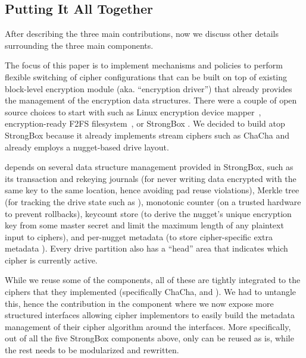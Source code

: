 \subsection{Putting It All Together}\label{subsec:des-summary}

After describing the three main contributions, now we discuss other details
surrounding the three main components.


 The focus of this paper is to implement
mechanisms and policies to perform flexible switching of cipher configurations
that can be built on top of existing block-level encryption module (aka.
``encryption driver'') that already provides the management of the encryption
data structures. There were a couple of open source choices to start with such
as Linux encryption device mapper~\cite{dmcrypt,DmC-Android}, encryption-ready
F2FS filesystem~\cite{F2FS}, or StrongBox \cite{StrongBox}. We decided to build
atop StrongBox because it already implements stream ciphers such as ChaCha and
already employs a nugget-based drive layout.

\sys depends on several data structure management provided in StrongBox, such as
its transaction and rekeying journals (for never writing data encrypted with the
same key to the same location, hence avoiding pad reuse violations), Merkle tree
(for tracking the drive state such as ), monotonic
counter (on a trusted hardware to prevent rollbacks), keycount store (to derive
the nugget's unique encryption key from some master secret and limit the maximum
length of any plaintext input to ciphers), and per-nugget metadata (to store
cipher-specific extra metadata ). Every drive partition also has a
``head'' area that indicates which cipher is currently active.

While we reuse some of the components, all of these are tightly integrated to
the ciphers that they implemented (specifically ChaCha, and \xxx). We had to
untangle this, hence the contribution in the \sysB component where we now expose
more structured interfaces allowing cipher implementors to easily build the
metadata management of their cipher algorithm around the interfaces. More
specifically, out of all the five  StrongBox components above, only
\xxx can be reused as is, while the rest needs to be modularized and rewritten.


